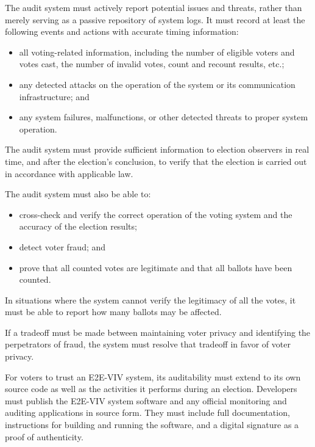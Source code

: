 The audit system must actively report potential issues and threats,
rather than merely serving as a passive repository of system logs. It
must record at least the following events and actions with accurate
timing information: 

\begin{itemize}
\item all voting-related information, including the number of eligible
  voters and votes cast, the number of invalid votes, count and
  recount results, etc.;
\item any detected attacks on the operation of the
  system or its communication infrastructure; and
\item any system failures,
  malfunctions, or other detected threats to proper system
  operation. 
\end{itemize}

The audit system must provide sufficient information to election
observers in real time, and after the election's conclusion, to verify
that the election is carried out in accordance with applicable law.

The audit system must also be able to:

\begin{itemize}
\item cross-check and verify the correct operation of the voting
  system and the accuracy of the election results;
\item detect voter fraud; and 
\item prove that all counted
votes are legitimate and that all ballots have been counted. 
\end{itemize}

In situations where the system cannot verify the legitimacy of all the
votes, it must be able to report how many ballots may be affected.

If a tradeoff must be made between maintaining voter privacy and
identifying the perpetrators of fraud, the system must resolve that
tradeoff in favor of voter privacy.

For voters to trust an E2E-VIV system, its auditability must extend to
its own source code as well as the activities it performs during an
election. Developers must publish the E2E-VIV system software and any
official monitoring and auditing applications in source form. They
must include full documentation, instructions for building and running
the software, and a digital signature as a proof of authenticity.

